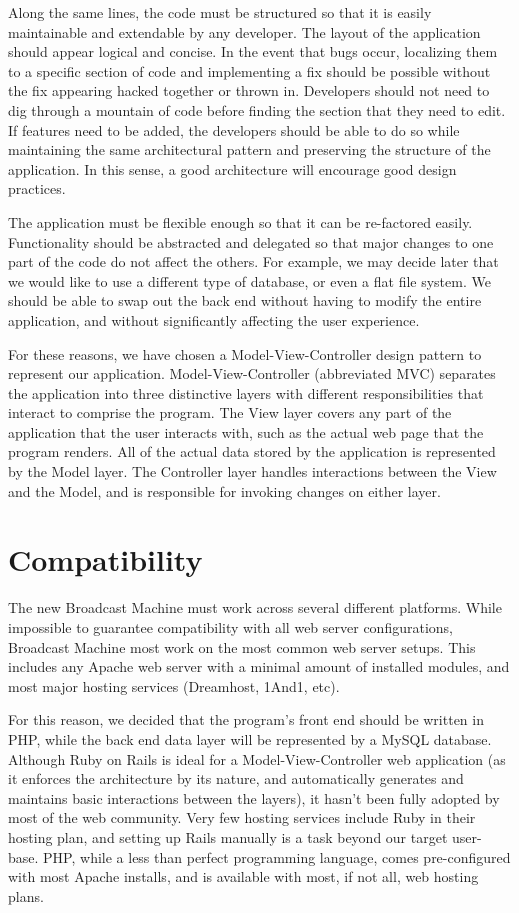 \documentclass[a4paper,12pt]{report}
\begin{document}
Along the same lines, the code must be structured so that it is easily maintainable and extendable by any developer. 
The layout of the application should appear logical and concise. 
In the event that bugs occur, localizing them to a specific section of code and implementing a fix should be possible without the fix appearing hacked together or thrown in. 
Developers should not need to dig through a mountain of code before finding the section that they need to edit. 
If features need to be added, the developers should be able to do so while maintaining the same architectural pattern and preserving the structure of the application. 
In this sense, a good architecture will encourage good design practices.

The application must be flexible enough so that it can be re-factored easily. Functionality should be abstracted and delegated so that major changes to one part of the code do not affect the others. 
For example, we may decide later that we would like to use a different type of database, or even a flat file system. We should be able to swap out the back end without having to modify the entire application, and without significantly affecting the user experience.

For these reasons, we have chosen a Model-View-Controller design pattern to represent our application. 
Model-View-Controller (abbreviated MVC) separates the application into three distinctive layers with different responsibilities that interact to comprise the program. 
The View layer covers any part of the application that the user interacts with, such as the actual web page that the program renders. 
All of the actual data stored by the application is represented by the Model layer. 
The Controller layer handles interactions between the View and the Model, and is responsible for invoking changes on either layer.

\section{Compatibility}

The new Broadcast Machine must work across several different platforms. 
While impossible to guarantee compatibility with all web server configurations, Broadcast Machine most work on the most common web server setups. 
This includes any Apache web server with a minimal amount of installed modules, and most major hosting services (Dreamhost, 1And1, etc). 

For this reason, we decided that the program’s front end should be written in PHP, while the back end data layer will be represented by a MySQL database. Although Ruby on Rails is ideal for a Model-View-Controller web application (as it enforces the architecture by its nature, and automatically generates and maintains basic interactions between the layers), it hasn’t been fully adopted by most of the web community. 
Very few hosting services include Ruby in their hosting plan, and setting up Rails manually is a task beyond our target user-base. 
PHP, while a less than perfect programming language, comes pre-configured with most Apache installs, and is available with most, if not all, web hosting plans. 
\end{document}
